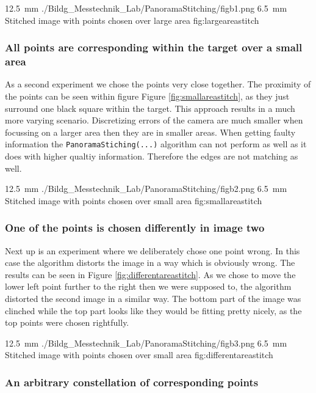 \documentclass[
a4paper,     %
12pt         %
]{scrartcl}  %
\begin{document}
{\SI{12.5}{mm}}
{./Bildg_Messtechnik_Lab/PanoramaStitching/figb1.png}
{\SI{6.5}{mm}}
{Stitched image with points chosen over large area}
{fig:largeareastitch}

\subsubsection{All points are corresponding within the target over a small area}

As a second experiment we chose the points very close together.
The proximity of the points can be seen within figure Figure \ref{fig:smallareastitch}, as they just surround one black square within the target.
This approach results in a much more varying scenario.
Discretizing errors of the camera are much smaller when focussing on a larger area then they are in smaller areas.
When getting faulty information the \lstinline{PanoramaStiching(...)} algorithm can not perform as well as it does with higher qualtiy information.
Therefore the edges are not matching as well.

{\SI{12.5}{mm}}
{./Bildg_Messtechnik_Lab/PanoramaStitching/figb2.png}
{\SI{6.5}{mm}}
{Stitched image with points chosen over small area}
{fig:smallareastitch}

\subsubsection{One of the points is chosen differently in image two}

Next up is an experiment where we deliberately chose one point wrong.
In this case the algorithm distorts the image in a way which is obviously wrong.
The results can be seen in Figure \ref{fig:differentareastitch}.
As we chose to move the lower left point further to the right then we were supposed to, the algorithm distorted the second image in a similar way.
The bottom part of the image was clinched while the top part looks like they would be fitting pretty nicely, as the top points were chosen rightfully.

{\SI{12.5}{mm}}
{./Bildg_Messtechnik_Lab/PanoramaStitching/figb3.png}
{\SI{6.5}{mm}}
{Stitched image with points chosen over small area}
{fig:differentareastitch}

\subsubsection{An arbitrary constellation of corresponding points}
\end{document}
